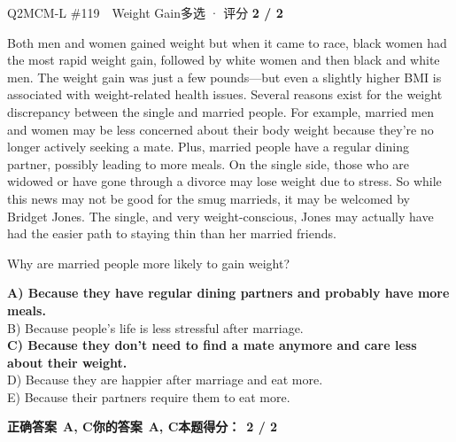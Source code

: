 \begin{qblock}{Q2\quad MCM-L \#119\ \ Weight Gain}{多选 · 评分 \textcolor{cAccent}{\bfseries 2 / 2}}
\begin{promptbox}
Both men and women gained weight but when it came to race, black women had the most rapid weight gain, followed by white women and then black and white men. The weight gain was just a few pounds---but even a slightly higher BMI is associated with weight-related health issues. Several reasons exist for the weight discrepancy between the single and married people. For example, married men and women may be less concerned about their body weight because they're no longer actively seeking a mate. Plus, married people have a regular dining partner, possibly leading to more meals. On the single side, those who are widowed or have gone through a divorce may lose weight due to stress. So while this news may not be good for the smug marrieds, it may be welcomed by Bridget Jones. The single, and very weight-conscious, Jones may actually have had the easier path to staying thin than her married friends.
\end{promptbox}
\begin{notebox}Why are married people more likely to gain weight?\end{notebox}
{\small
{\color{cFix}\textbf{A) Because they have regular dining partners and probably have more meals.}}\\
B) Because people's life is less stressful after marriage.\\
{\color{cFix}\textbf{C) Because they don't need to find a mate anymore and care less about their weight.}}\\
D) Because they are happier after marriage and eat more.\\
E) Because their partners require them to eat more.}
\par\smallskip
\textbf{正确答案}\ \textcolor{cFix}{\bfseries A, C}\qquad\textbf{你的答案}\ \textcolor{cFix}{\bfseries A, C}\qquad\textbf{本题得分：}\ {\color{cAccent}\bfseries 2 / 2}
\end{qblock}

